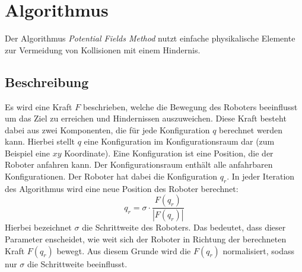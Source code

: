 \section{Algorithmus}\label{sec:algo}

Der Algorithmus \textit{Potential Fields Method} nutzt einfache physikalische Elemente zur Vermeidung von Kollisionen mit einem Hindernis.

\subsection{Beschreibung}
Es wird eine Kraft $F$ beschrieben, welche die Bewegung des Roboters beeinflusst um das Ziel zu erreichen und Hindernissen auszuweichen.
Diese Kraft besteht dabei aus zwei Komponenten, die für jede Konfiguration $q$ berechnet werden kann.
Hierbei stellt $q$ eine Konfiguration im Konfigurationsraum dar (zum Beispiel eine $xy$ Koordinate).
Eine Konfiguration ist eine Position, die der Roboter anfahren kann.
Der Konfigurationsraum enthält alle anfahrbaren Konfigurationen.
Der Roboter hat dabei die Konfiguration $q_r$.
In jeder Iteration des Algorithmus wird eine neue Position des Roboter berechnet:
\begin{equation}
	q_r = \sigma \cdot \frac{F(q_r)}{|F(q_r)|}
\end{equation}
Hierbei bezeichnet $\sigma$ die Schrittweite des Roboters. Das bedeutet, dass dieser Parameter enscheidet, wie weit sich der Roboter in Richtung der berechneten Kraft $F(q_r)$ bewegt. Aus diesem Grunde wird die $F(q_r)$ normalisiert, sodass nur $\sigma$ die Schrittweite beeinflusst.


